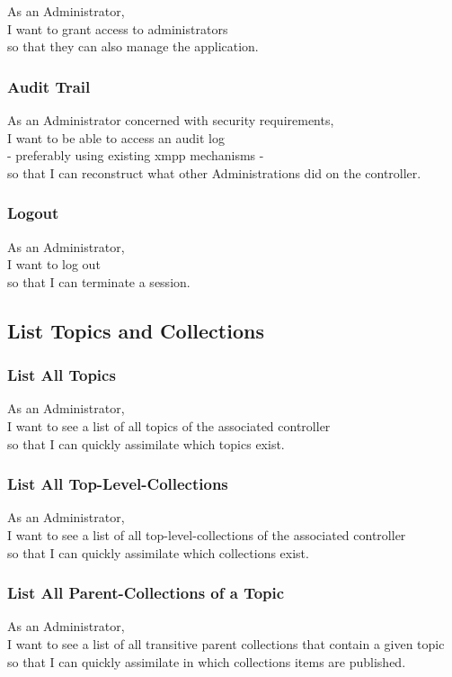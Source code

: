 As an Administrator,\\
I want to grant access to administrators \\
so that they can also manage the application.

\subsubsection{Audit Trail}\label{sec:requirement-audit-trail}

As an Administrator concerned with security requirements,\\
I want to be able to access an audit log\\
- preferably using existing \gls{xmpp} mechanisms - \\
so that I can reconstruct what other Administrations did on the controller.

\subsubsection{Logout}\label{sec:requirement-logout}

As an Administrator,\\
I want to log out\\
so that I can terminate a session.

\subsection{List Topics and Collections}\label{sec:list-topics}

\subsubsection{List All Topics}\label{sec:requirement-list-all-topics}
As an Administrator,\\
I want to see a list of all topics of the associated controller\\
so that I can quickly assimilate which topics exist.

\subsubsection{List All Top-Level-Collections}
As an Administrator,\\
I want to see a list of all top-level-collections of the associated controller\\
so that I can quickly assimilate which collections exist.

\subsubsection{List All Parent-Collections of a Topic}
As an Administrator,\\
I want to see a list of all transitive parent collections that contain a given topic\\
so that I can quickly assimilate in which collections items are published.


